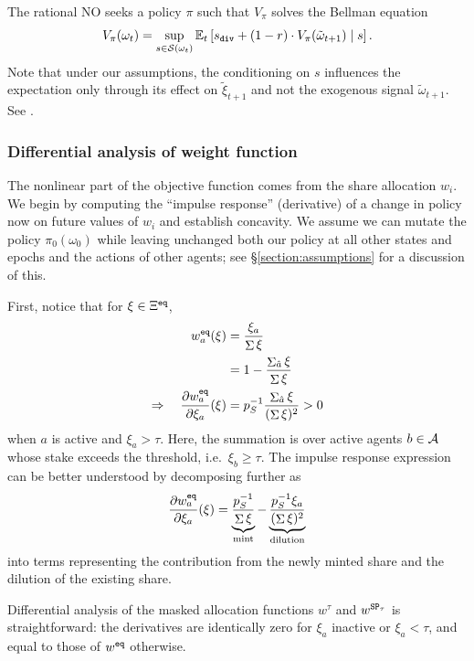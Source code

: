 The rational NO seeks a policy $\pi$ such that $V_\pi$ solves the Bellman equation
\[
  V_\pi(\omega_t) = \sup_{s\in\mathcal{S}(\omega_t)} 
    \mathbb{E}_t\left[ 
      s_\mathtt{div} + (1-r)\cdot V_\pi(\tilde\omega_{t+1}) 
      \mid s
    \right].
\]
%
Note that under our assumptions, the conditioning on $s$ influences the expectation only through its effect on $\tilde\xi_{t+1}$ and not the exogenous signal $\tilde\omega_{t+1}$.
%
See \cite[Chap.~4]{sutton2018reinforcement}.

\subsubsection{Differential analysis of weight function}


The nonlinear part of the objective function comes from the share allocation $w_i$. 
%
We begin by computing the ``impulse response'' (derivative) of a change in policy now on future values of $w_i$ and establish concavity.
%
We assume we can mutate the policy $\pi_0(\omega_0)$ while leaving unchanged both our policy at all other states and epochs and the actions of other agents; see \S\ref{section:assumptions} for a discussion of this.

First, notice that for $\xi\in\Xi^{\mathtt{eq}}$,
\begin{align*}
  w_a^{\mathtt{eq}}(\xi) &= \frac{ \xi_a }{ \mathop{\Sigma}\xi } \\
  &= 1 - \frac{ \mathop{\Sigma}_{\hat{a}}\xi }{ \mathop{\Sigma}\xi }  \\
  \Rightarrow\quad  \frac{\partial w_a^{\mathtt{eq}}}{\partial \xi_a}(\xi) &= p_S^{-1}\frac{\mathop{\Sigma}_{\hat{a}} \xi}{(\mathop{\Sigma} \xi)^2} > 0 \\
\end{align*}
when $a$ is active and $\xi_a>\tau$.
%
Here, the summation is over active agents $b\in\mathcal{A}$ whose stake exceeds the threshold, i.e.~$\xi_b\geq\tau$.
%
The impulse response expression can be better understood by decomposing further as
\[
  \frac{\partial w_a^{\mathtt{eq}}}{\partial \xi_a}(\xi) = 
    \underbrace{ \frac{ p_S^{-1} }{ \mathop{\Sigma}\xi } }_{\text{mint}} - 
    \underbrace{ \frac{ p_S^{-1}\xi_a}{ (\mathop{\Sigma}\xi)^2 } }_{\text{dilution}}
\]
into terms representing the contribution from the newly minted share and the dilution of the existing share.

Differential analysis of the masked allocation functions $w^\tau$ and $w^{\mathtt{SP}_\tau}$ is straightforward: the derivatives are identically zero for $\xi_a$ inactive or $\xi_a <\tau$, and equal to those of $w^{\mathtt{eq}}$ otherwise.

